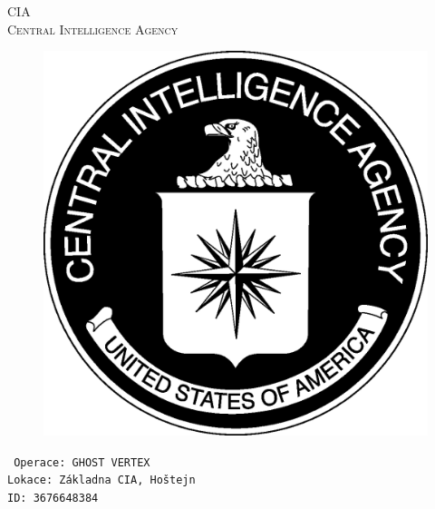 \documentclass[a4paper, \fontheight]{article}
\begin{document}
	\begin{titlepage}
		\begin{center}		
			\textsc{{\fontsize{80}{0}\selectfont CIA}\\[2em]
				\Huge Central Intelligence Agency\\[2.5em]}
				
			\begin{figure}[H]
				\centering
				\includegraphics[scale=0.6]{sources/CIA_logo.eps}
			\end{figure}
		\end{center}	
		\vfill
		\noindent
		\texttt{\LARGE
				Operace: GHOST VERTEX\\[0.4em]
				Lokace: Základna CIA, Hoštejn\\[0.4em]
				ID: 3676648384}	
\end{titlepage} 
\end{document}
